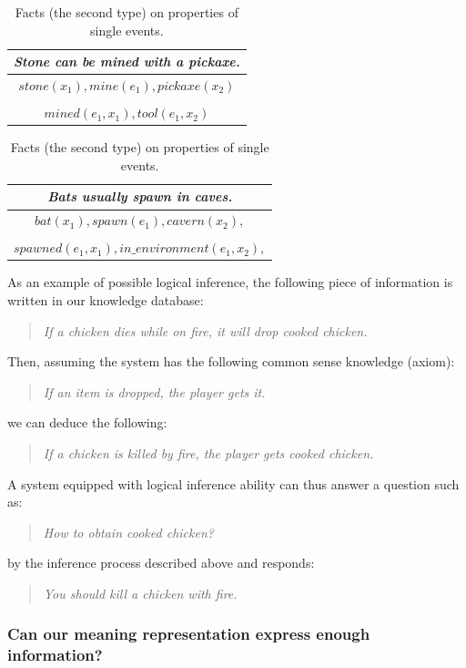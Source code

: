 \documentclass[12pt]{article}
\begin{document}
\begin{table}[!ht]
\center
\begin{tabular}{|c|}
\hline
\textit{Stone can be mined with a pickaxe.}\\
\hline
\textit{$stone(x_1), mine(e_1), pickaxe(x_2)$}\\
\\
\textit{$mined(e_1,x_1), tool(e_1,x_2)$}\\
\hline
\end{tabular}
\begin{tabular}{|c|}
\hline
\textit{Bats usually spawn in caves.}\\
\hline
\textit{$bat(x_1), spawn(e_1), cavern(x_2),$}\\
\\
\textit{$spawned(e_1,x_1), in\_environment(e_1,x_2),$}\\
\hline
\end{tabular}
\caption{\label{fact3} Facts (the second type) on properties of single events.}
\end{table}

As an example of possible logical inference, the following piece of information is written in our knowledge database: 
\begin{quote}
\textit{If a chicken dies while on fire, it will drop cooked chicken.}
\end{quote}
Then, assuming the system has the following common sense knowledge (axiom): 
\begin{quote}
\textit{If an item is dropped, the player gets it.}
\end{quote}
we can deduce the following: 
\begin{quote}
\textit{If a chicken is killed by fire, the player gets cooked chicken.}
\end{quote}
A system equipped with logical inference ability can thus answer a question such as:
\begin{quote}
\textit{How to obtain cooked chicken?}
\end{quote}
by the inference process described above and responds: 
\begin{quote}
\textit{You should kill a chicken with fire.}
\end{quote}

\subsubsection{Can our meaning representation express enough information?}
\end{document}
